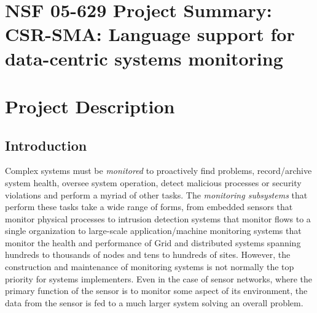 \documentclass[11pt]{article}
\begin{document}
\setcounter{page}{1}
\appendix
\section{NSF 05-629 Project Summary:  \\
CSR-SMA: Language support for data-centric systems monitoring
}

\newpage
\setcounter{page}{1}
\section{Project Description}

\subsection{Introduction}
\label{ssec:intro}

Complex systems must be {\em monitored} to proactively find problems,
record/archive system health, oversee system operation, detect
malicious processes or security violations and perform a myriad of other tasks.
The {\em monitoring subsystems} 
that perform these tasks take a wide range of forms, 
from embedded sensors that monitor physical processes to
intrusion detection systems that monitor flows to a single
organization to large-scale application/machine monitoring systems
that monitor the health and performance of Grid and distributed
systems spanning hundreds to thousands of nodes and tens to hundreds
of sites.  However, the construction and maintenance of monitoring systems
is not normally the top priority for systems implementers.  Even in the 
case of sensor
networks, where the primary function of the sensor is to monitor some
aspect of its environment, the data from the sensor is fed to a much
larger system solving an overall problem.
\end{document}
